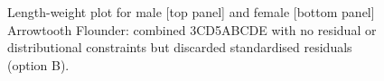 \begin{figure}[htp]
\captionsetup[subfigure]{labelformat=empty}
\begin{center}
\newline
{}
\end{center}
\caption{Length-weight plot for male [top panel] and female [bottom panel] Arrowtooth Flounder: combined 3CD5ABCDE with no residual or distributional constraints but discarded standardised residuals (option B).}
\label{fig:lwOptionB}
\end{figure}

